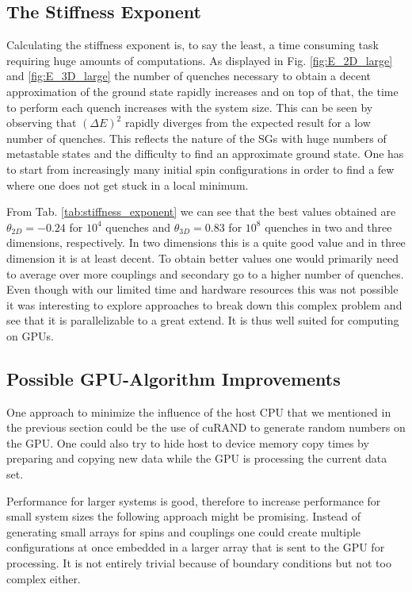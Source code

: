 \documentclass[paper=a4, fontsize=11pt]{scrartcl} %
\numberwithin{equation}{section} %
\numberwithin{figure}{section} %
\numberwithin{table}{section} %
\begin{document}
\subsection{The Stiffness Exponent}
Calculating the stiffness exponent is, to say the least, a time consuming task requiring huge amounts of computations. As displayed in Fig. \ref{fig:E_2D_large} and \ref{fig:E_3D_large} the number of quenches necessary to obtain a decent approximation of the ground state rapidly increases and on top of that, the time to perform each quench increases with the system size. This can be seen by observing that $(\Delta E)^2$ rapidly diverges from the expected result for a low number of quenches. This reflects the nature of the SGs with huge numbers of metastable states and the difficulty to find an approximate ground state. One has to start from increasingly many initial spin configurations in order to find a few where one does not get stuck in a local minimum. 

From Tab. \ref{tab:stiffness_exponent} we can see that the best values obtained are $\theta_{2D}=-0.24$ for $10^4$ quenches and $\theta_{3D}=0.83$ for $10^8$ quenches in two and three dimensions, respectively. In two dimensions this is a quite good value and in three dimension it is at least decent. To obtain better values one would primarily need to average over more couplings and secondary go to a higher number of quenches. Even though with our limited time and hardware resources this was not possible it was interesting to explore approaches to break down this complex problem and see that it is parallelizable to a great extend. It is thus well suited for computing on GPUs.

\subsection{Possible GPU-Algorithm Improvements}
\label{sec:discussion_gpualgo}

One  approach to minimize the influence of the host CPU that we mentioned in the previous section could be the use of cuRAND to generate random numbers on the GPU. One could also try to hide host to device memory copy times by preparing and copying new data while the GPU is processing the current data set.

Performance for larger systems is good, therefore to increase performance for small system sizes the following approach might be promising. Instead of generating small arrays for spins and couplings one could create multiple configurations at once embedded in a larger array that is sent to the GPU for processing. It is not entirely trivial because of boundary conditions but not too complex either.
\end{document}
